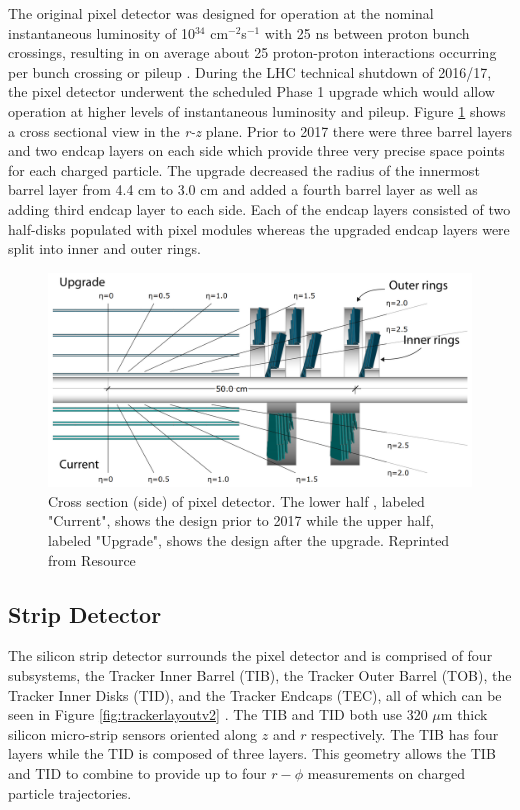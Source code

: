 The original pixel detector was designed for operation at the nominal instantaneous luminosity of 10$^{34}$ cm$^{-2}$s$^{-1}$ with 25 ns between proton bunch crossings, resulting in on average about 25 proton-proton interactions occurring per bunch crossing or pileup \cite{Chatrchyan:1704291}.  During the LHC technical shutdown of 2016/17, the pixel detector underwent the scheduled Phase 1 upgrade which would allow operation at higher levels of instantaneous luminosity and pileup.  Figure \ref{fig:trackersideview} shows a cross sectional view in the \textit{r-z} plane.  Prior to 2017 there were three barrel layers and two endcap layers on each side which provide three very precise space points for each charged particle.  The upgrade decreased the radius of the innermost barrel layer from 4.4 cm to 3.0 cm and added a fourth barrel layer as well as adding third endcap layer to each side.  Each of the endcap layers consisted of two half-disks populated with pixel modules whereas the upgraded endcap layers were split into inner and outer rings. \cite{Dominguez:1481838}
\begin{figure}[h]
	\centering
	\includegraphics[width=1.0\linewidth]{Figures/Tracker_sideview}
	\caption{Cross section (side) of pixel detector. The lower half , labeled "Current", shows the design prior to 2017 while the upper half, labeled "Upgrade", shows the design after the upgrade. Reprinted from Resource \cite{Dominguez:1481838}}
	\label{fig:trackersideview}
\end{figure}

\label{section:pixelupgrade}

\subsection{Strip Detector}
The silicon strip detector surrounds the pixel detector and is comprised of four subsystems, the Tracker Inner Barrel (TIB), the Tracker Outer Barrel (TOB), the Tracker Inner Disks (TID), and the Tracker Endcaps (TEC), all of which can be seen in Figure \ref{fig:trackerlayoutv2} \cite{Collaboration_2008}. The TIB and TID both use 320 $\mu$m thick silicon micro-strip sensors oriented along $z$ and $r$ respectively.  The TIB has four layers while the TID is composed of three layers.  This geometry allows the TIB and TID to combine to provide up to four $r-\phi$ measurements on charged particle trajectories.

